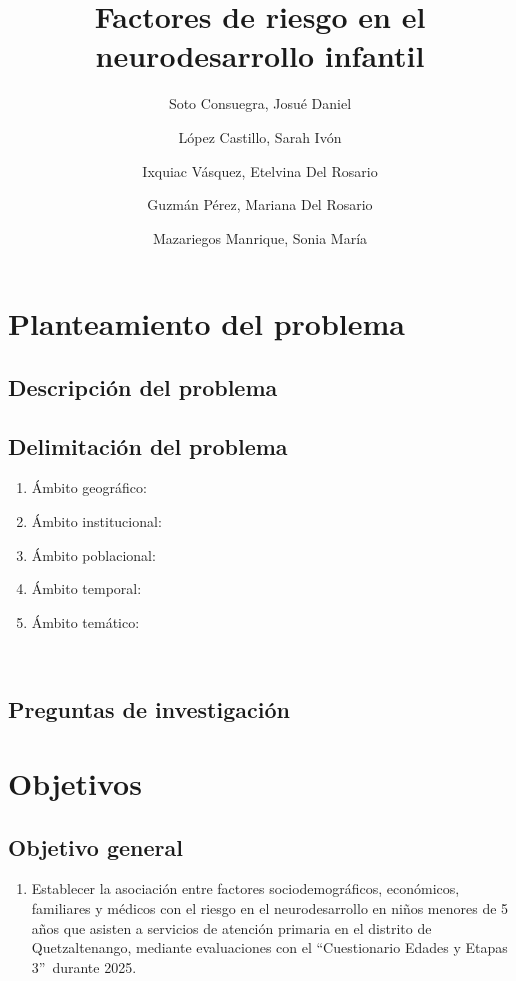 \documentclass[11pt,letterpaper]{report}
\title{Factores de riesgo en el neurodesarrollo infantil}
\author{Soto Consuegra, Josué Daniel \and López Castillo, Sarah Ivón \and
Ixquiac Vásquez, Etelvina Del Rosario \and Guzmán Pérez, Mariana Del Rosario
\and Mazariegos Manrique, Sonia María}
\newcommand{\asq}{“Cuestionario Edades y Etapas 3”}
\begin{document}
	\tableofcontents
	\chapter{Planteamiento del problema}
\section{Descripción del problema}
\section{Delimitación del problema}
	\begin{enumerate}
		\item Ámbito geográfico:
		\item Ámbito institucional:
		\item Ámbito poblacional:
		\item Ámbito temporal:
		\item Ámbito temático:
	\end{enumerate}\
\section{Preguntas de investigación}

	\chapter{Objetivos}
\section{Objetivo general}
	\begin{enumerate}
		\item Establecer la asociación entre factores sociodemográficos,
		económicos, familiares y médicos con el riesgo en el neurodesarrollo en
		niños menores de 5 años que asisten a servicios de atención primaria en
		el distrito de Quetzaltenango, mediante evaluaciones con el \asq\
		durante 2025.
	\end{enumerate}
\end{document}
